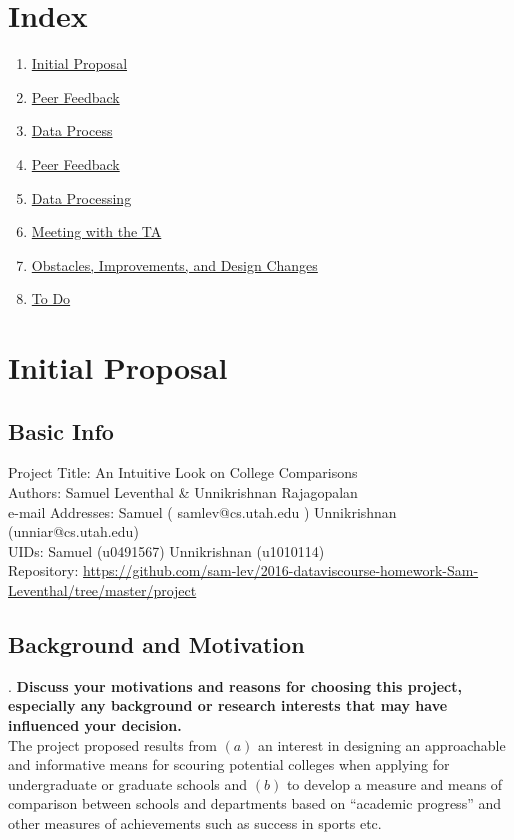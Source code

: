 \documentclass[11pt, a4paper]{article}
\begin{document}
\fi

\section{Index}
\begin{enumerate}
\item \href{sec:Initial Proposal}{Initial Proposal}
\item \href{sec:Peer Feedback}{Peer Feedback}
\item \href{sec:Data Process}{Data Process}
\item \href{sec:Peer Feedback}{Peer Feedback}
\item \href{sec:Data Processing}{Data Processing}
\item \href{sec:Meeting with the TA}{Meeting with the TA}
\item \href{sec:Obstacles, Improvements, and Design Changes}{Obstacles, Improvements, and Design Changes}
\item \href{sec:To Do}{To Do} 
\end{enumerate}


\section{Initial Proposal}
\subsection{Basic Info}
Project Title: An Intuitive Look on College Comparisons\\
Authors: Samuel Leventhal \& Unnikrishnan Rajagopalan\\
e-mail Addresses: Samuel ( samlev@cs.utah.edu ) Unnikrishnan (unniar@cs.utah.edu)\\
UIDs: Samuel (u0491567) Unnikrishnan (u1010114)\\
Repository: \href{https://github.com/sam-lev/2016-dataviscourse-homework-Sam-Leventhal/tree/master/project}{https://github.com/sam-lev/2016-dataviscourse-homework-Sam-Leventhal/tree/master/project}

\subsection{Background and Motivation}.\textbf{ Discuss your motivations and reasons for choosing this project, especially any background or research interests that may have influenced your decision.}\\
The project proposed results from $(a)$ an interest in designing an approachable and informative means for scouring potential colleges when applying for undergraduate or graduate schools and $(b)$ to develop a measure and means of comparison between schools and departments based on ``academic progress'' and other measures of achievements such as success in sports etc. 
\end{document}
